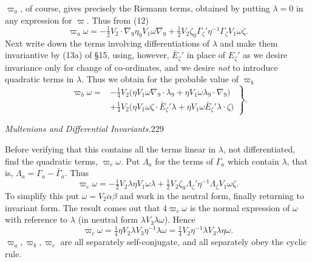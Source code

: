 \documentclass[11pt]{article}
\begin{document}
\indent $\varpi_a$, of course, gives precisely the Riemann terms, obtained by putting $\lambda=0$ in any expression for $\varpi$. Thus from (12)
\begin{equation}\varpi_a\omega=-\tfrac12V_2\mathbin{\cdot}\nabla_9\eta_9V_1\omega\nabla_9+\tfrac12V_2\zeta_0\Gamma_\zeta'\eta^{-1}\Gamma_\zeta V_1\omega\zeta.\tag{14}\end{equation}
Next write down the terms involving differentiations of $\lambda$ and make them invariantive by (13a) of \S15, using, however, $\bar E_\zeta'$ in place of $E_\zeta'$ as we desire invariance only for change of co-ordinates, and we desire \emph{not} to introduce quadratic terms in $\lambda$. Thus we obtain for the probable value of $\varpi_b$
\begin{equation}
\left.\begin{aligned}
\varpi_b\omega={}&-\tfrac14V_2\bigl(\eta V_1\omega\nabla_9\mathbin{\cdot}\lambda_9+\eta V_1\omega\lambda_9\mathbin{\cdot}\nabla_9\bigr)\\
&+\tfrac14V_2\bigl(\eta V_1\omega\zeta\mathbin{\cdot}\bar E_\zeta'\lambda+\eta V_1\omega\bar E_\zeta'\lambda\mathbin{\cdot}\zeta\bigr)
\end{aligned}\right\}.\tag{15}
\end{equation}
\newpage\thispagestyle{empty}\begin{center}\textit{Multenions and Differential Invariants.}\hfill 229\end{center}
Before verifying that this contains all the terms linear in $\lambda$, not differentiated, find the quadratic terms, $\varpi_c\omega$. Put $\Lambda_a$ for the terms of $\Gamma_a$ which contain $\lambda$, that is, $\Lambda_a=\Gamma_a-\bar\Gamma_a$. Thus
\begin{equation}\varpi_c\omega=-\tfrac12V_2\lambda\eta V_1\omega\lambda+\tfrac12V_2\zeta_0\Lambda_\zeta'\eta^{-1}\Lambda_\zeta V_1\omega\zeta.\tag{16}\end{equation}
To simplify this put $\omega=V_2\alpha\beta$ and work in the neutral form, finally returning to invariant form. The result comes out that $4\varpi_c\omega$ is the normal expression of $\omega$ with reference to $\lambda$ (in neutral form $\lambda V_3\lambda\omega$). Hence
\begin{equation}\varpi_c\omega=\tfrac14\eta V_2\lambda V_3\eta^{-1}\lambda\omega=\tfrac14V_2\eta^{-1}\lambda V_3\lambda\eta\omega.\tag{17}\end{equation}
$\varpi_a,\varpi_b,\varpi_c$ are all separately self-conjugate, and all separately obey the cyclic rule.
\end{document}
